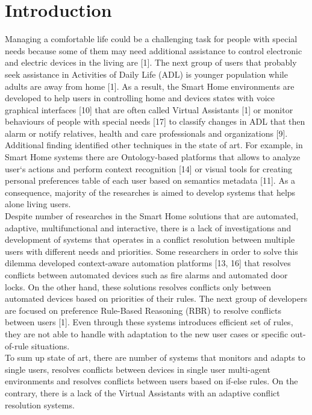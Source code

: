 \documentclass{llncs}
\begin{document}
    \section{Introduction}
    Managing a comfortable life could be a challenging task for people with special needs because some of them may need additional
    assistance to control electronic and electric devices in the living are [1]. The next group of users that probably seek
    assistance in Activities of Daily Life (ADL) is younger population while adults are away from home [1]. As a result,
    the Smart Home environments are developed to help users in controlling home and devices states with voice graphical
    interfaces [10] that are often called Virtual Assistants [1] or monitor behaviours of people
    with special needs [17] to classify changes in ADL that then alarm or notify relatives, health and care professionals
    and organizations [9]. Additional finding identified other techniques in the state of art.
    For example, in Smart Home systems there are Ontology-based platforms that allows to analyze user`s actions and
    perform context recognition [14] or visual tools for creating personal preferences table of each user based on semantics
    metadata [11]. As a consequence, majority of the researches is aimed to develop systems that helps alone living users.\\
    Despite number of
    researches in the Smart Home solutions that are automated, adaptive, multifunctional and interactive, there is a lack of
    investigations and development of systems that operates in a conflict resolution between multiple users with different
    needs and priorities. Some researchers in order to solve this dilemma developed context-aware automation platforms
    [13, 16] that resolves conflicts between automated devices such as fire alarms and automated door locks.
    On the other hand, these solutions resolves conflicts only between automated devices based on priorities of their rules.
    The next group of
    developers are focused on preference Rule-Based Reasoning (RBR) to resolve conflicts between users [1]. Even through
    these systems introduces efficient set of rules, they are not able to handle with adaptation to the new user cases or
    specific out-of-rule situations. \\
    To sum up
    state of art, there are number of systems that monitors and adapts to single users, resolves conflicts between devices
    in single user multi-agent environments and resolves conflicts between users based on if-else rules. On the contrary,
    there is a lack of the Virtual Assistants with an adaptive conflict resolution systems.
\end{document}
